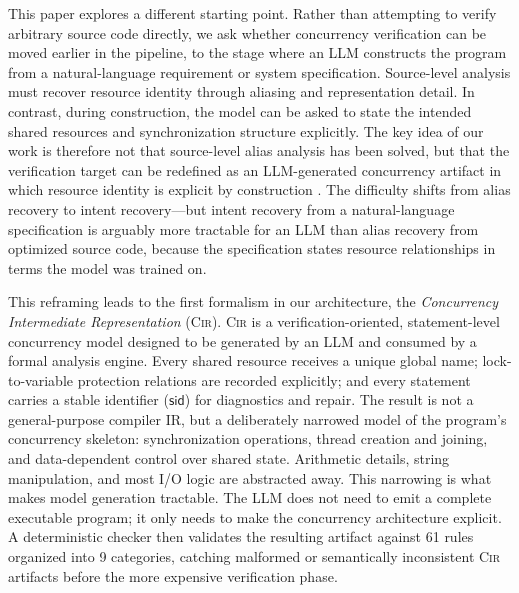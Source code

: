 \documentclass[sigconf]{acmart}
\begin{document}
This paper explores a different starting point. Rather than attempting to verify arbitrary source code directly, we ask whether concurrency verification can be moved earlier in the pipeline, to the stage where an LLM constructs the program from a natural-language requirement or system specification. Source-level analysis must recover resource identity through aliasing and representation detail. In contrast, during construction, the model can be asked to state the intended shared resources and synchronization structure explicitly. The key idea of our work is therefore not that source-level alias analysis has been solved, but that the verification target can be redefined as an LLM-generated concurrency artifact in which resource identity is explicit by construction \cite{Chen2021CodeLLMs,Fan2023RepairFromLLMs,Xia2023APRLLMs}. The difficulty shifts from alias recovery to intent recovery—but intent recovery from a natural-language specification is arguably more tractable for an LLM than alias recovery from optimized source code, because the specification states resource relationships in terms the model was trained on. 


This reframing leads to the first formalism in our architecture, the \emph{Concurrency Intermediate Representation} (\textsc{Cir}). \textsc{Cir} is a verification-oriented, statement-level concurrency model designed to be generated by an LLM and consumed by a formal analysis engine. Every shared resource receives a unique global name; lock-to-variable protection relations are recorded explicitly; and every statement carries a stable identifier ($\mathsf{sid}$) for diagnostics and repair. The result is not a general-purpose compiler IR, but a deliberately narrowed model of the program's concurrency skeleton: synchronization operations, thread creation and joining, and data-dependent control over shared state. Arithmetic details, string manipulation, and most I/O logic are abstracted away. This narrowing is what makes model generation tractable. The LLM does not need to emit a complete executable program; it only needs to make the concurrency architecture explicit. A deterministic checker then validates the resulting artifact against 61 rules organized into 9 categories, catching malformed or semantically inconsistent \textsc{Cir} artifacts before the more expensive verification phase.
\end{document}
